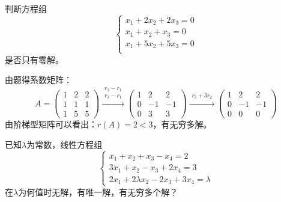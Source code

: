 \documentclass[a4paper]{report}
\begin{document}
\EX 判断方程组
\begin{equation*}
\begin{cases}
x_1+2x_2+2x_3=0\\
x_1+x_2+x_3=0\\
x_1+5x_2+5x_3=0\\
\end{cases}
\end{equation*}
是否只有零解。

\begin{jie}
由题得系数矩阵：
\begin{equation*}
A=
\begin{pmatrix}
1&2&2\\
1&1&1\\
1&5&5
\end{pmatrix}
\xrightarrow{\substack{r_2-r_1\\ r_3-r_1}}{
\begin{pmatrix}
1&2&2\\
0&-1&-1\\
0&3&3
\end{pmatrix}
}\xrightarrow{\substack{r_3+3r_2}}{
\begin{pmatrix}
1&2&2\\
0&-1&-1\\
0&0&0
\end{pmatrix}
}
\end{equation*}
由阶梯型矩阵可以看出：$r(A)=2<3$，有无穷多解。
\end{jie}

\EX 已知$\lambda$为常数，线性方程组
\begin{equation*}
\begin{cases}
x_1+x_2+x_3-x_4=2\\
3x_1+x_2-x_3+2x_4=3\\
2x_1+2\lambda x_2-2x_3+3x_4=\lambda
\end{cases}
\end{equation*}
在$\lambda$为何值时无解，有唯一解，有无穷多个解？
\end{document}
